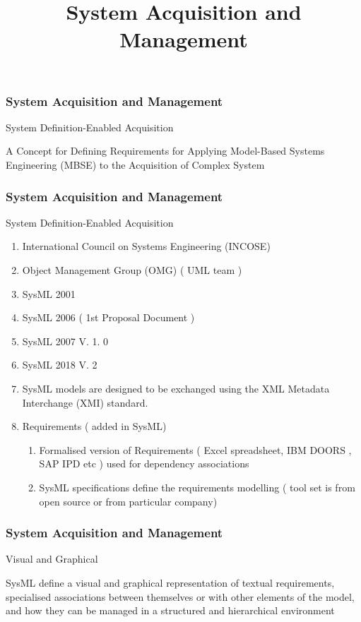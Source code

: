 
\title[Systems Engineering]{System Acquisition and Management } 

\newpage
\begin{frame}
\frametitle{ System Acquisition and Management }
\begin{block}{System Definition-Enabled Acquisition}


A Concept for Defining Requirements for Applying Model-Based Systems Engineering (MBSE) to the Acquisition of  Complex System

\end{block}
\end{frame}


\newpage
\begin{frame}
\frametitle{ System Acquisition and Management }
\begin{block}{System Definition-Enabled Acquisition}

\begin{enumerate}
    \item International Council on Systems Engineering (INCOSE) 
    \item Object Management Group (OMG) ( UML team )
    \item SysML  2001
     \item SysML  2006  ( 1st Proposal Document )
     \item SysML 2007  V. 1. 0
      \item SysML 2018  V. 2
      \item  SysML models are designed to be exchanged using the XML Metadata Interchange (XMI) standard. 
    \item Requirements ( added in SysML)
    \begin{enumerate}
         \item  Formalised version of Requirements  ( Excel spreadsheet, IBM DOORS , SAP IPD etc ) used for dependency associations
         \item SysML specifications define the requirements modelling ( tool set is from open source or from particular company)

    \end{enumerate}
   
\end{enumerate}


\end{block}
\end{frame}


\newpage
\begin{frame}
\frametitle{ System Acquisition and Management }
\begin{block}{Visual and Graphical }

SysML define a visual and graphical representation of
textual requirements, specialised associations between themselves or with other elements of the
model, and how they can be managed in a structured and hierarchical environment


\end{block}
\end{frame}


